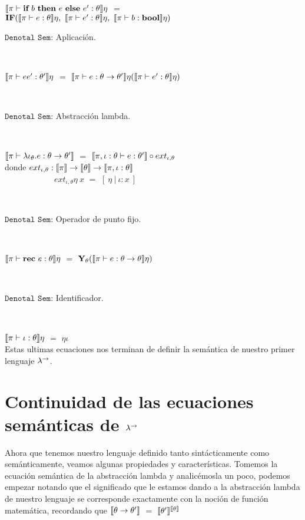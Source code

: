 $\llbracket \pi \vdash \textbf{if} \ b \ \textbf{then} \ e \ \textbf{else} \ e' : \theta \rrbracket\eta$ $=$ \\
\indent \indent \indent \indent \indent \indent \indent 
$\textbf{IF} (\llbracket \pi \vdash e : \theta \rrbracket\eta
	 , \ \llbracket \pi \vdash e' : \theta \rrbracket\eta
	 , \ \llbracket \pi \vdash b : \textbf{bool} \rrbracket\eta
	 )$

\newpage

\noindent
$\texttt{Denotal Sem:}$ Aplicaci\'on.\

\

$\llbracket \pi \vdash ee' : \theta' \rrbracket\eta$ $=$ $\llbracket \pi \vdash e : \theta \rightarrow \theta' \rrbracket\eta (\llbracket \pi \vdash e' : \theta \rrbracket\eta)$

\

\noindent
$\texttt{Denotal Sem:}$ Abstracci\'on lambda.\

\

$\llbracket \pi \vdash \lambda \iota_{\theta} . e : \theta \rightarrow \theta' \rrbracket$ $=$
		$\llbracket \pi,\iota:\theta \vdash e : \theta' \rrbracket \circ ext_{\iota,\theta}$\\

donde 
$ext_{\iota,\theta} : \llbracket \pi \rrbracket 
					  \rightarrow \llbracket \theta \rrbracket \rightarrow \llbracket \pi,\iota:\theta \rrbracket$\\
\indent \ \ \ \ \ \ \ \ \ \ \ \
$ext_{\iota,\theta} \eta \ x$ $=$ $[\ \eta \ | \ \iota:x \ ]$

\

\noindent
$\texttt{Denotal Sem:}$ Operador de punto fijo.\

\

$\llbracket \pi \vdash \textbf{rec} \ e : \theta \rrbracket\eta$ $=$ $\textbf{Y}_{\theta} (\llbracket \pi \vdash e : \theta \rightarrow \theta \rrbracket\eta)$

\

\noindent
$\texttt{Denotal Sem:}$ Identificador.\

\

$\llbracket \pi \vdash \iota : \theta \rrbracket\eta$ $=$ $\eta \iota$\\

Estas ultimas ecuaciones nos terminan de definir la sem\'antica de nuestro 
primer lenguaje $\lambda^{\rightarrow}$.

\section{Continuidad de las ecuaciones sem\'anticas de $\lambda^{\rightarrow}$}

Ahora que tenemos nuestro lenguaje definido tanto sint\'acticamente como
sem\'anticamente, veamos algunas propiedades y caracter\'isticas. Tomemos
la ecuaci\'on sem\'antica de la abstracci\'on lambda y analic\'emosla un 
poco, podemos empezar notando que el significado que le estamos dando
a la abstracci\'on lambda de nuestro lenguaje se corresponde exactamente
con la noci\'on de funci\'on matem\'atica, recordando que 
$\llbracket \theta \rightarrow \theta' \rrbracket$ $=$ $\llbracket \theta' \rrbracket^{\llbracket \theta \rrbracket}$\\

